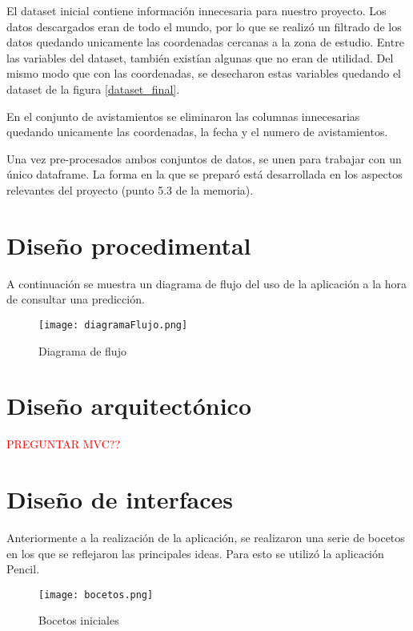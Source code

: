 El dataset inicial contiene información innecesaria para nuestro proyecto. Los datos descargados eran de todo el mundo, por lo que se realizó un filtrado de los datos quedando unicamente las coordenadas cercanas a la zona de estudio. Entre las variables del dataset, también existían algunas que no eran de utilidad. Del mismo modo que con las coordenadas, se desecharon estas variables quedando el dataset de la figura \ref{dataset_final}.

\label{dataset_final}

En el conjunto de avistamientos se eliminaron las columnas innecesarias quedando unicamente las coordenadas, la fecha y el numero de avistamientos.

Una vez pre-procesados ambos conjuntos de datos, se unen para trabajar con un único dataframe. La forma en la que se preparó está desarrollada en los aspectos relevantes del proyecto (punto 5.3 de la memoria).

\section{Diseño procedimental}

A continuación se muestra un diagrama de flujo del uso de la aplicación a la hora de consultar una predicción.

\begin{figure}[!h]
	\centering
	\texttt{[image: diagramaFlujo.png]}
	\caption{Diagrama de flujo}\label{fig:diagrama}
\end{figure}

\section{Diseño arquitectónico}

\textcolor{red}{PREGUNTAR MVC??}

\section{Diseño de interfaces}

Anteriormente a la realización de la aplicación, se realizaron una serie de bocetos en los que se reflejaron las principales ideas. Para esto se utilizó la aplicación Pencil.

\begin{figure}[!h]
	\centering
	\texttt{[image: bocetos.png]}
	\caption{Bocetos iniciales}\label{fig:bocetos}
\end{figure}







